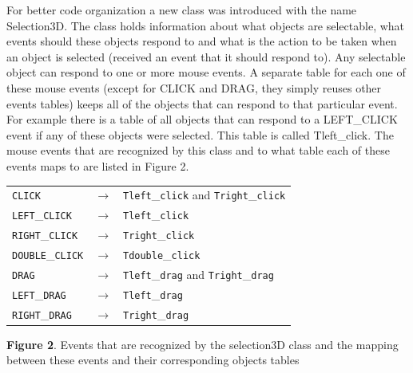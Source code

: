 \documentclass[letterpaper]{article}
\begin{document}
{For better code organization a new class was introduced with the name
Selection3D. The class holds information about what objects are
selectable, what events should these objects respond to and what is
the action to be taken when an object is selected (received an event
that it should respond to). Any selectable object can respond to one
or more mouse events. A separate table for each one of these mouse
events (except for \textsf{CLICK} and \textsf{DRAG}, they simply
reuses other events tables) keeps all of the objects that can respond
to that particular event. For example there is a table of all objects
that can respond to a \textsf{LEFT}\textsf{\_}\textsf{CLICK} event if
any of these objects were selected. This table is called
\textsf{Tleft}\textsf{\_}\textsf{click}. The mouse events that are
recognized by this class and to what table each of these events maps
to are listed in Figure 2.



\begin{center}
\begin{minipage}{4.8445in}

\bigskip

\begin{tabular}{|l l l|}\hline
\texttt{CLICK} & $\rightarrow$ & \texttt{Tleft}\_\texttt{click} and
					\texttt{Tright}\_\texttt{click} \\
\texttt{LEFT}\_\texttt{CLICK} &  $\rightarrow$ &  \texttt{Tleft}\_\texttt{click}\\
\texttt{RIGHT}\_\texttt{CLICK} &  $\rightarrow$ &  \texttt{Tright}\_\texttt{click}\\
\texttt{DOUBLE}\_\texttt{CLICK} &  $\rightarrow$ &  \texttt{Tdouble}\_\texttt{click}\\
\texttt{DRAG} &  $\rightarrow$ &  \texttt{Tleft}\_\texttt{drag} and \texttt{Tright}\_\texttt{drag}\\
\texttt{LEFT}\_\texttt{DRAG} &  $\rightarrow$ & \texttt{Tleft}\_\texttt{drag}\\
\texttt{RIGHT}\_\texttt{DRAG} &  $\rightarrow$ & \texttt{Tright}\_\texttt{drag}\\
\hline
\end{tabular}
\end{minipage}
\end{center}

\begin{center}
\begin{minipage}{5.1264in}
{
\textbf{Figure 2}. Events that are recognized by the selection3D class
and the mapping between these events and their corresponding objects tables}
\end{minipage}
\end{center}

}
\end{document}
